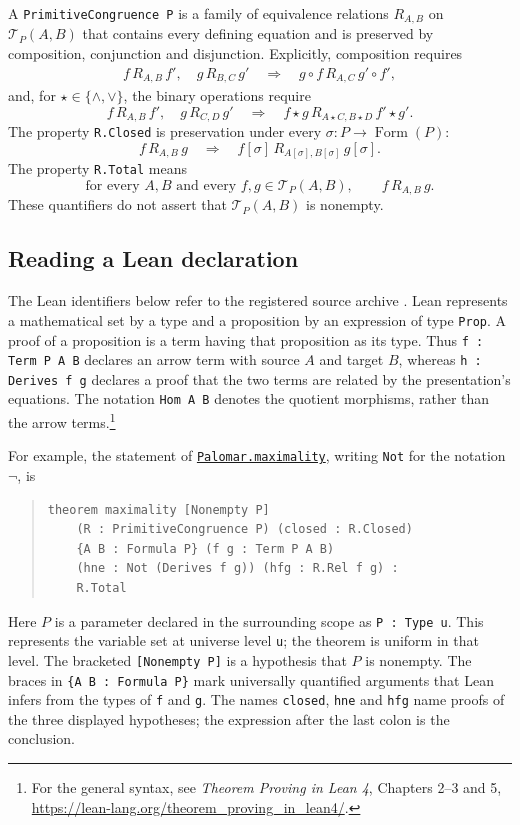 \documentclass[11pt]{article}
\newcommand{\FormulaSet}{\operatorname{Form}}
\begin{document}
A \texttt{PrimitiveCongruence P} is a family of equivalence relations
$R_{A,B}$ on $\mathcal T_P(A,B)$ that contains every defining equation
and is preserved by composition, conjunction and disjunction.
Explicitly, composition requires
\[
 \begin{gathered}
 f\,R_{A,B}\,f',\quad g\,R_{B,C}\,g'
 \quad\Longrightarrow\quad
 g\circ f\,R_{A,C}\,g'\circ f',
 \end{gathered}
\]
and, for $\star\in\{\wedge,\vee\}$, the binary operations require
\[
 f\,R_{A,B}\,f',\quad g\,R_{C,D}\,g'
 \quad\Longrightarrow\quad
 f\star g\,R_{A\star C,B\star D}\,f'\star g'.
\]
The property \texttt{R.Closed} is preservation under every
$\sigma:P\to\FormulaSet(P)$:
\[
 f\,R_{A,B}\,g
 \quad\Longrightarrow\quad
 f[\sigma]\,R_{A[\sigma],B[\sigma]}\,g[\sigma].
\]
The property \texttt{R.Total} means
\[
 \text{for every }A,B\text{ and every }f,g\in\mathcal T_P(A,B),
 \qquad f\,R_{A,B}\,g.
\]
These quantifiers do not assert that $\mathcal T_P(A,B)$ is nonempty.

\subsection{Reading a Lean declaration}\label{app:reading-lean}

The Lean identifiers below refer to the registered source archive
\cite{palomar-2026-10-30-000014-v3}.
Lean represents a mathematical set by a type and a proposition by
an expression of type \texttt{Prop}. A proof of a proposition is a
term having that proposition as its type. Thus
\texttt{f : Term P A B} declares an arrow term with source $A$
and target $B$, whereas \texttt{h : Derives f g} declares a proof
that the two terms are related by the presentation's equations.
The notation \texttt{Hom A B} denotes the quotient morphisms, rather
than the arrow terms.\footnote{\raggedright For the general syntax, see
\emph{Theorem Proving in Lean 4}, Chapters 2--3 and 5,
\url{https://lean-lang.org/theorem_proving_in_lean4/}.}

For example, the statement of \href{https://github.com/flengyel/Dosen-Petric-Maximality/blob/dosen-petric-v25-palomar-v3/DosenPetric/PalomarMaximality.lean\#L17}{\texttt{Palomar.maximality}},
writing \texttt{Not} for the notation $\neg$, is
\begin{quote}
\begin{verbatim}
theorem maximality [Nonempty P]
    (R : PrimitiveCongruence P) (closed : R.Closed)
    {A B : Formula P} (f g : Term P A B)
    (hne : Not (Derives f g)) (hfg : R.Rel f g) :
    R.Total
\end{verbatim}
\end{quote}
Here $P$ is a parameter declared in the surrounding scope as
\texttt{P : Type u}. This represents the variable set at universe
level \texttt{u}; the theorem is uniform in that level.
The bracketed \texttt{[Nonempty P]} is a hypothesis that $P$ is
nonempty. The braces in \texttt{\{A B : Formula P\}} mark
universally quantified arguments that Lean infers from the types
of \texttt{f} and \texttt{g}.
The names \texttt{closed}, \texttt{hne} and \texttt{hfg} name
proofs of the three displayed hypotheses; the expression after
the last colon is the conclusion.
\end{document}
